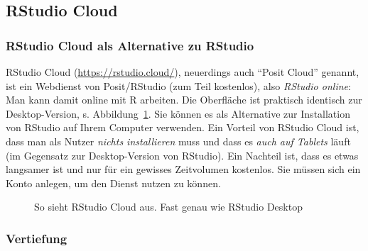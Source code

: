 \documentclass[
  a4paper,
]{scrbook}
\theoremstyle{definition}
\theoremstyle{definition}
\theoremstyle{definition}
\theoremstyle{remark}
\begin{document}
\subsection{RStudio Cloud}\label{rstudio-cloud}

\subsubsection{RStudio Cloud als Alternative zu
RStudio}\label{rstudio-cloud-als-alternative-zu-rstudio}

RStudio Cloud (\url{https://rstudio.cloud/}), neuerdings auch ``Posit
Cloud'' genannt, ist ein Webdienst von Posit/RStudio (zum Teil
kostenlos), also \emph{RStudio online}: Man kann damit online mit R
arbeiten. Die Oberfläche ist praktisch identisch zur Desktop-Version, s.
Abbildung~\ref{fig-rstudio-cloud}. Sie können es als Alternative zur
Installation von RStudio auf Ihrem Computer verwenden. Ein Vorteil von
RStudio Cloud ist, dass man als Nutzer \emph{nichts installieren} muss
und dass es \emph{auch auf Tablets} läuft (im Gegensatz zur
Desktop-Version von RStudio). Ein Nachteil ist, dass es etwas langsamer
ist und nur für ein gewisses Zeitvolumen kostenlos. Sie müssen sich ein
Konto anlegen, um den Dienst nutzen zu können.

\begin{figure}


\caption{\label{fig-rstudio-cloud}So sieht RStudio Cloud aus. Fast genau
wie RStudio Desktop}

\end{figure}%

\subsubsection{Vertiefung}\label{vertiefung-1}
\end{document}
